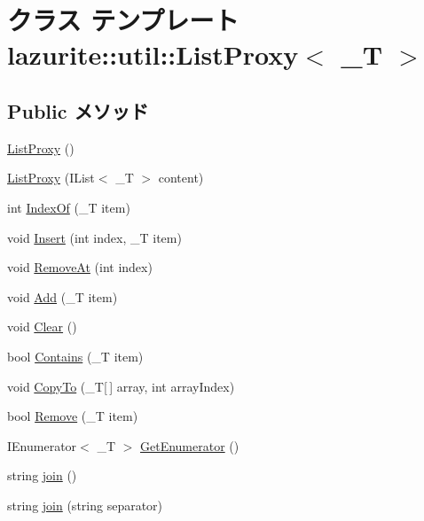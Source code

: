 \hypertarget{classlazurite_1_1util_1_1_list_proxy_3_01___t_01_4}{
\section{クラス テンプレート lazurite::util::ListProxy$<$ \_\-T $>$}
\label{classlazurite_1_1util_1_1_list_proxy_3_01___t_01_4}
}
\subsection*{Public メソッド}
\begin{DoxyCompactItemize}
\item 
\hyperlink{classlazurite_1_1util_1_1_list_proxy_3_01___t_01_4_a2b05d56c8139d1adab14de90fba34630}{ListProxy} ()
\item 
\hyperlink{classlazurite_1_1util_1_1_list_proxy_3_01___t_01_4_a1b722cbe4b8a5838d5ae0d5d45a2e641}{ListProxy} (IList$<$ \_\-T $>$ content)
\item 
int \hyperlink{classlazurite_1_1util_1_1_list_proxy_3_01___t_01_4_a403991b14e1a2b032c52416ee53ab362}{IndexOf} (\_\-T item)
\item 
void \hyperlink{classlazurite_1_1util_1_1_list_proxy_3_01___t_01_4_a1747d5d46bfb99157e4cb18eb6981894}{Insert} (int index, \_\-T item)
\item 
void \hyperlink{classlazurite_1_1util_1_1_list_proxy_3_01___t_01_4_a4553ca037303249d30bbaec5a6d41450}{RemoveAt} (int index)
\item 
void \hyperlink{classlazurite_1_1util_1_1_list_proxy_3_01___t_01_4_a8a8288d8815ad6dec4000ab681a98735}{Add} (\_\-T item)
\item 
void \hyperlink{classlazurite_1_1util_1_1_list_proxy_3_01___t_01_4_a319f515b41d2c54b9c090130f344b5a4}{Clear} ()
\item 
bool \hyperlink{classlazurite_1_1util_1_1_list_proxy_3_01___t_01_4_a97b821ac9f0e40ad8e09f891dc95dc81}{Contains} (\_\-T item)
\item 
void \hyperlink{classlazurite_1_1util_1_1_list_proxy_3_01___t_01_4_a108b024a0a14ea3bd359f56b2798bfdb}{CopyTo} (\_\-T\mbox{[}$\,$\mbox{]} array, int arrayIndex)
\item 
bool \hyperlink{classlazurite_1_1util_1_1_list_proxy_3_01___t_01_4_aa8bce69fce5b6e29c47febe85dbc1af1}{Remove} (\_\-T item)
\item 
IEnumerator$<$ \_\-T $>$ \hyperlink{classlazurite_1_1util_1_1_list_proxy_3_01___t_01_4_abb661cdae591021dfd34cb2ebca92542}{GetEnumerator} ()
\item 
string \hyperlink{classlazurite_1_1util_1_1_list_proxy_3_01___t_01_4_adeb7b242424d19bf4bf0b597d94469bf}{join} ()
\item 
string \hyperlink{classlazurite_1_1util_1_1_list_proxy_3_01___t_01_4_aa74c472acda80df78ac5a789a4411bc8}{join} (string separator)
\end{DoxyCompactItemize}
